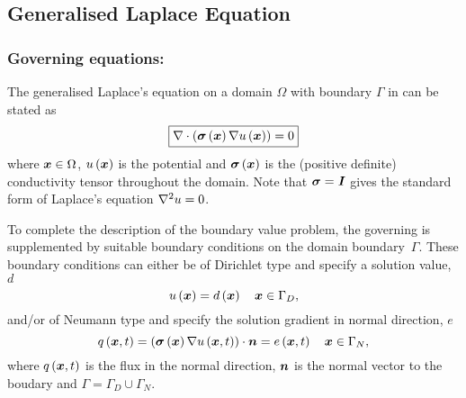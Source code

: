 \subsection{Generalised Laplace Equation}


\subsubsection{Governing equations:}

The generalised Laplace's equation on a domain $\Omega$ with boundary $\Gamma$
in \OpenCMISS can be stated as
\begin{equation}
  \boxed{
    \divergence{}{\pbrac{\fnof{\tensor{\sigma}}{\vectr{x}}\gradient{}{\fnof{u}{\vectr{x}}}}}=0
  }
  \label{eqn:generalisedLaplaceequation}
\end{equation}
where $\boldsymbol{x}\in\Omega$, $ u\left( \boldsymbol{x} \right) $ is the potential and 
$ \boldsymbol{\mathit{\sigma}}\left( \boldsymbol{x} \right) $ is the (positive definite) conductivity
tensor throughout the domain. Note that $\boldsymbol{\mathit{\sigma}}=\boldsymbol{\mathit{I}}$ gives 
the standard form of Laplace's equation \ie $\laplacian{}{u}=0$.

To complete the description of the boundary value problem,
the governing  is supplemented
by suitable boundary conditions on the domain boundary~$\Gamma$.
These boundary conditions can either be of Dirichlet type and specify a
solution value, $d$ \ie
\begin{equation}
  \fnof{u}{\vectr{x}} = \fnof{d}{\vectr{x}} \quad \vectr{x}\in\Gamma_{D},
  \label{eqn:LaplaceDirichletBC} 
\end{equation}
and/or of Neumann type and specify the solution gradient in normal direction,
$e$ \ie
\begin{equation}
  \fnof{q}{\vectr{x},t} = \dotprod{\pbrac{\fnof{\tensor{\sigma}}{\vectr{x}}
      \gradient{}{\fnof{u}{\vectr{x},t}}}}{\normal} =
  \fnof{e}{\vectr{x},t} \quad \vectr{x}\in\Gamma_{N},  
  \label{eqn:LaplaceNeumannBC} 
\end{equation}
where $ q\left( \boldsymbol{x},t \right) $ is the flux in the normal direction, $\boldsymbol{n}$ is the normal
vector to the boudary and $\Gamma = \Gamma_D \cup \Gamma_N$.

